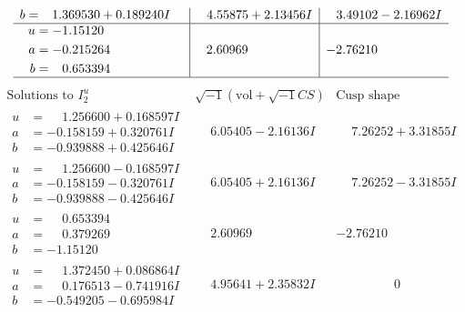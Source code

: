 \documentclass[1p]{elsarticle_modified}
\theoremstyle{definition}
\newcommand{\I}{\sqrt{-1}}
\begin{document}
$$\begin{array}{c|c|c}
\begin{aligned}
b &= \phantom{-}1.369530 + 0.189240 I\end{aligned}
 & \phantom{-}4.55875 + 2.13456 I & \phantom{-}3.49102 - 2.16962 I \\ \hline\begin{aligned}
u &= -1.15120\phantom{ +0.000000I} \\
a &= -0.215264\phantom{ +0.000000I} \\
b &= \phantom{-}0.653394\phantom{ +0.000000I}\end{aligned}
 & \phantom{-}2.60969\phantom{ +0.000000I} & -2.76210\phantom{ +0.000000I}\\
 \hline 
 \end{array}$$\newpage$$\begin{array}{c|c|c}  
\text{Solutions to }I^u_{2}& \I (\text{vol} + \sqrt{-1}CS) & \text{Cusp shape}\\
 \hline 
\begin{aligned}
u &= \phantom{-}1.256600 + 0.168597 I \\
a &= -0.158159 + 0.320761 I \\
b &= -0.939888 + 0.425646 I\end{aligned}
 & \phantom{-}6.05405 - 2.16136 I & \phantom{-}7.26252 + 3.31855 I \\ \hline\begin{aligned}
u &= \phantom{-}1.256600 - 0.168597 I \\
a &= -0.158159 - 0.320761 I \\
b &= -0.939888 - 0.425646 I\end{aligned}
 & \phantom{-}6.05405 + 2.16136 I & \phantom{-}7.26252 - 3.31855 I \\ \hline\begin{aligned}
u &= \phantom{-}0.653394\phantom{ +0.000000I} \\
a &= \phantom{-}0.379269\phantom{ +0.000000I} \\
b &= -1.15120\phantom{ +0.000000I}\end{aligned}
 & \phantom{-}2.60969\phantom{ +0.000000I} & -2.76210\phantom{ +0.000000I} \\ \hline\begin{aligned}
u &= \phantom{-}1.372450 + 0.086864 I \\
a &= \phantom{-}0.176513 - 0.741916 I \\
b &= -0.549205 - 0.695984 I\end{aligned}
 & \phantom{-}4.95641 + 2.35832 I & \phantom{-0.000000 } 0 \\ \hline\begin{aligned}

\end{aligned}
\end{array}$$
\end{document}
